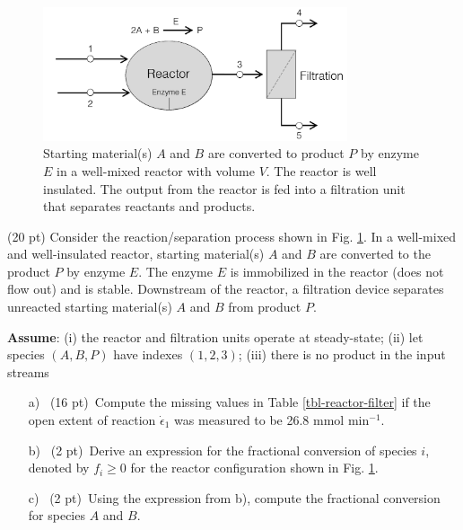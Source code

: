 \begin{figure}[h!]\centering
  \includegraphics[width=0.80\textwidth]{./figs/Fig-Schematic-Reactor-Problem.pdf}
  \caption{Starting material(s) $A$ and $B$ are converted to product $P$ by enzyme $E$ in a well-mixed reactor with volume $V$. 
  The reactor is well insulated. 
  The output from the reactor is fed into a filtration unit that separates reactants and products.}\label{fig-reactor-splitter}
  \end{figure}

    \item{(20 pt) Consider the reaction/separation process shown in Fig. \ref{fig-reactor-splitter}.
    In a well-mixed and well-insulated reactor, starting material(s) $A$ and $B$ are converted to the product $P$ by enzyme $E$.
    The enzyme $E$ is immobilized in the reactor (does not flow out) and is stable. Downstream of the reactor,
    a filtration device separates unreacted starting material(s) $A$ and $B$ from product $P$.
   
    \textbf{Assume}: (i) the reactor and filtration units operate at steady-state;
    (ii) let species $(A,B,P)$ have indexes $(1,2,3)$;
    (iii) there is no product in the input streams

    \begin{itemize}
        \item[a)]{~(16 pt)~Compute the missing values in Table \ref{tbl-reactor-filter} if the open extent of reaction $\dot{\epsilon}_{1}$ was measured to be 26.8 mmol min$^{-1}$.}
        \item[b)]{~(2 pt)~Derive an expression for the fractional conversion of species $i$, denoted by $f_{i}\geq{0}$ for the reactor configuration shown in Fig. \ref{fig-reactor-splitter}}. 
        \item[c)]{~(2 pt)~Using the expression from b), compute the fractional conversion for species $A$ and $B$.}

    \end{itemize}
    }


    \clearpage
    
